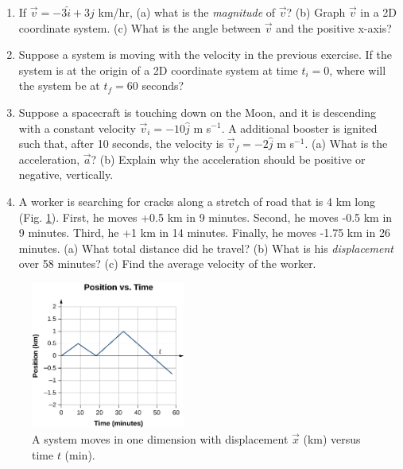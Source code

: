 \documentclass{article}
\begin{document}
\begin{enumerate}
\item If $\vec{v} = -3\hat{i} + 3\hat{j}$ km/hr, (a) what is the \textit{magnitude} of $\vec{v}$? (b) Graph $\vec{v}$ in a 2D coordinate system. (c) What is the angle between $\vec{v}$ and the positive x-axis? \\ \vspace{4cm}
\item Suppose a system is moving with the velocity in the previous exercise.  If the system is at the origin of a 2D coordinate system at time $t_i=0$, where will the system be at $t_f = 60$ seconds? \\ \vspace{3cm}
\item Suppose a spacecraft is touching down on the Moon, and it is descending with a constant velocity $\vec{v}_i = -10 \hat{j}$ m s$^{-1}$.  A additional booster is ignited such that, after 10 seconds, the velocity is $\vec{v}_f = -2 \hat{j}$ m s$^{-1}$.  (a) What is the acceleration, $\vec{a}$? (b) Explain why the acceleration should be positive or negative, vertically. \\ \vspace{2cm}
\item A worker is searching for cracks along a stretch of road that is 4 km long (Fig. \ref{fig:1}).  First, he moves +0.5 km in 9 minutes.  Second, he moves -0.5 km in 9 minutes.  Third, he +1 km in 14 minutes.  Finally, he moves -1.75 km in 26 minutes.  (a) What total distance did he travel? (b) What is his \textit{displacement} over 58 minutes? (c) Find the average velocity of the worker.
\end{enumerate}

\begin{figure}
\centering
\includegraphics[width=0.45\textwidth]{figures/graph_x_t.jpeg}
\caption{\label{fig:1} A system moves in one dimension with displacement $\vec{x}$ (km) versus time $t$ (min).}
\end{figure}
\end{document}
